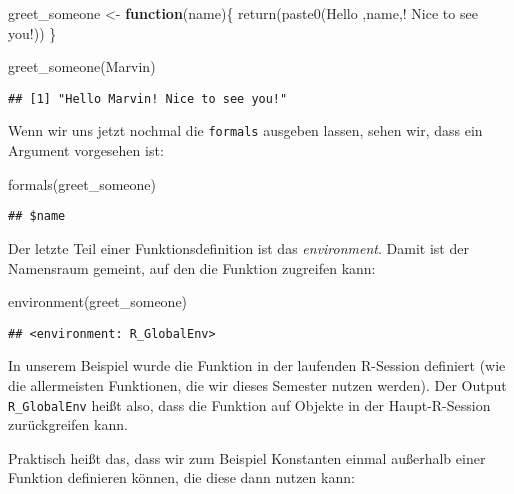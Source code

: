 \documentclass[
]{book}
\newenvironment{Shaded}{\begin{snugshade}}{\end{snugshade}}
\newcommand{\ControlFlowTok}[1]{\textcolor[rgb]{0.13,0.29,0.53}{\textbf{#1}}}
\newcommand{\FunctionTok}[1]{\textcolor[rgb]{0.00,0.00,0.00}{#1}}
\newcommand{\NormalTok}[1]{#1}
\newcommand{\OtherTok}[1]{\textcolor[rgb]{0.56,0.35,0.01}{#1}}
\newcommand{\StringTok}[1]{\textcolor[rgb]{0.31,0.60,0.02}{#1}}
\begin{document}
\begin{Shaded}
\begin{Highlighting}[]
\NormalTok{greet\_someone }\OtherTok{\textless{}{-}} \ControlFlowTok{function}\NormalTok{(name)\{}
  \FunctionTok{return}\NormalTok{(}\FunctionTok{paste0}\NormalTok{(}\StringTok{\textquotesingle{}Hello \textquotesingle{}}\NormalTok{,name,}\StringTok{\textquotesingle{}! Nice to see you!\textquotesingle{}}\NormalTok{))}
\NormalTok{\}}

\FunctionTok{greet\_someone}\NormalTok{(}\StringTok{\textquotesingle{}Marvin\textquotesingle{}}\NormalTok{)}
\end{Highlighting}
\end{Shaded}

\begin{verbatim}
## [1] "Hello Marvin! Nice to see you!"
\end{verbatim}

Wenn wir uns jetzt nochmal die \texttt{formals} ausgeben lassen, sehen wir, dass ein Argument vorgesehen ist:

\begin{Shaded}
\begin{Highlighting}[]
\FunctionTok{formals}\NormalTok{(greet\_someone)}
\end{Highlighting}
\end{Shaded}

\begin{verbatim}
## $name
\end{verbatim}

Der letzte Teil einer Funktionsdefinition ist das \emph{environment}. Damit ist der Namensraum gemeint, auf den die Funktion zugreifen kann:

\begin{Shaded}
\begin{Highlighting}[]
\FunctionTok{environment}\NormalTok{(greet\_someone)}
\end{Highlighting}
\end{Shaded}

\begin{verbatim}
## <environment: R_GlobalEnv>
\end{verbatim}

In unserem Beispiel wurde die Funktion in der laufenden R-Session definiert (wie die allermeisten Funktionen, die wir dieses Semester nutzen werden). Der Output \texttt{R\_GlobalEnv} heißt also, dass die Funktion auf Objekte in der Haupt-R-Session zurückgreifen kann.

Praktisch heißt das, dass wir zum Beispiel Konstanten einmal außerhalb einer Funktion definieren können, die diese dann nutzen kann:
\end{document}
